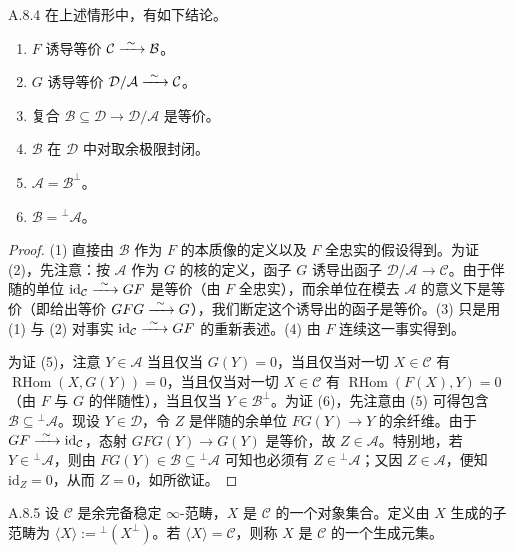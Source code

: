 \begin{lem}{A.8.4}\label{thm:a4-18-5}
在上述情形中，有如下结论。
\begin{enumerate}[label=(\arabic*),leftmargin=2.4em,itemsep=0.15em]
\item $F$ 诱导等价 $\mathcal C\xrightarrow{\ \sim\ }\mathcal B$。
\item $G$ 诱导等价 $\mathcal D/\mathcal A\xrightarrow{\ \sim\ }\mathcal C$。
\item 复合 $\mathcal B\subseteq\mathcal D\to\mathcal D/\mathcal A$ 是等价。
\item $\mathcal B$ 在 $\mathcal D$ 中对取余极限封闭。
\item $\mathcal A=\mathcal B^{\perp}$。
\item $\mathcal B={}^{\perp}\mathcal A$。
\end{enumerate}
\end{lem}
\begin{proof}
(1) 直接由 $\mathcal B$ 作为 $F$ 的本质像的定义以及 $F$ 全忠实的假设得到。为证 (2)，先注意：按 $\mathcal A$ 作为 $G$ 的核的定义，函子 $G$ 诱导出函子 $\mathcal D/\mathcal A\to\mathcal C$。由于伴随的单位 $\mathrm{id}_{\mathcal C}\xrightarrow{\ \sim\ } GF$ 是等价（由 $F$ 全忠实），而余单位在模去 $\mathcal A$ 的意义下是等价（即给出等价 $GFG\xrightarrow{\ \sim\ } G$），我们断定这个诱导出的函子是等价。(3) 只是用 (1) 与 (2) 对事实 $\mathrm{id}_{\mathcal C}\xrightarrow{\ \sim\ } GF$ 的重新表述。(4) 由 $F$ 连续这一事实得到。

为证 (5)，注意 $Y\in\mathcal A$ 当且仅当 $G(Y)=0$，当且仅当对一切 $X\in\mathcal C$ 有 $\operatorname{RHom}(X,G(Y))=0$，当且仅当对一切 $X\in\mathcal C$ 有 $\operatorname{RHom}(F(X),Y)=0$（由 $F$ 与 $G$ 的伴随性），当且仅当 $Y\in\mathcal B^{\perp}$。为证 (6)，先注意由 (5) 可得包含 $\mathcal B\subseteq{}^{\perp}\mathcal A$。现设 $Y\in\mathcal D$，令 $Z$ 是伴随的余单位 $FG(Y)\to Y$ 的余纤维。由于 $GF\xrightarrow{\ \sim\ }\mathrm{id}_{\mathcal C}$，态射 $GFG(Y)\to G(Y)$ 是等价，故 $Z\in\mathcal A$。特别地，若 $Y\in{}^{\perp}\mathcal A$，则由 $FG(Y)\in\mathcal B\subseteq{}^{\perp}\mathcal A$ 可知也必须有 $Z\in{}^{\perp}\mathcal A$；又因 $Z\in\mathcal A$，便知 $\mathrm{id}_Z=0$，从而 $Z=0$，如所欲证。
\end{proof}

\begin{defn}{A.8.5}\label{thm:a4-18-6}
设 $\mathcal C$ 是余完备稳定 $\infty$-范畴，$X$ 是 $\mathcal C$ 的一个对象集合。定义由 $X$ 生成的子范畴为 $\langle X\rangle:={}^{\perp}(X^{\perp})$。若 $\langle X\rangle=\mathcal C$，则称 $X$ 是 $\mathcal C$ 的一个生成元集。
\end{defn}


